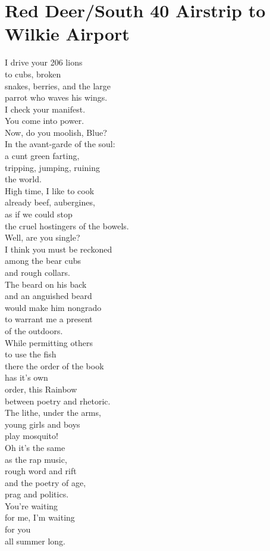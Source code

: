 \documentclass[smalldemyvopaper,11pt,twoside,onecolumn,openright,extrafontsizes]{memoir}
\begin{document}
\chapter{Red Deer/South 40 Airstrip to Wilkie Airport}
I drive your 206 lions
\\to cubs, broken
\\snakes, berries, and the large
\\parrot who waves his wings.
\\I check your manifest.
\\You come into power.
\\Now, do you moolish, Blue?
\\In the avant-garde of the soul:
\\a cunt green farting,
\\tripping, jumping, ruining
\\the world.
\\High time, I like to cook
\\already beef, aubergines,
\\as if we could stop
\\the cruel hostingers of the bowels.
\\Well, are you single?
\\I think you must be reckoned
\\among the bear cubs
\\and rough collars.
\\The beard on his back
\\and an anguished beard
\\would make him nongrado
\\to warrant me a present
\\of the outdoors.
\\While permitting others
\\to use the fish
\\there the order of the book
\\has it's own
\\order, this Rainbow
\\between poetry and rhetoric.
\\The lithe, under the arms,
\\young girls and boys
\\play mosquito!
\\Oh it's the same
\\as the rap music,
\\rough word and rift
\\and the poetry of age,
\\prag and politics.
\\You're waiting
\\for me, I'm waiting
\\for you
\\all summer long.
\end{document}
